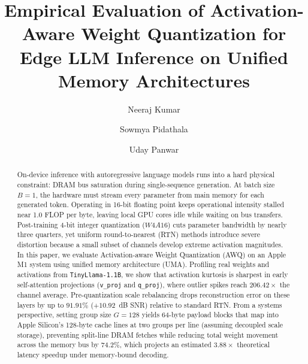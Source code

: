 \documentclass[runningheads,oribibl]{llncs}
\begin{document}
\title{Empirical Evaluation of Activation-Aware Weight Quantization for Edge LLM Inference on Unified Memory Architectures}

\author{Neeraj Kumar \and
Sowmya Pidathala \and
Uday Panwar}


\maketitle

\begin{abstract}
On-device inference with autoregressive language models runs into a hard physical constraint: DRAM bus saturation during single-sequence generation. At batch size $B=1$, the hardware must stream every parameter from main memory for each generated token. Operating in 16-bit floating point keeps operational intensity stalled near 1.0 FLOP per byte, leaving local GPU cores idle while waiting on bus transfers. Post-training 4-bit integer quantization ($W4A16$) cuts parameter bandwidth by nearly three quarters, yet uniform round-to-nearest (RTN) methods introduce severe distortion because a small subset of channels develop extreme activation magnitudes. In this paper, we evaluate Activation-aware Weight Quantization (AWQ) on an Apple M1 system using unified memory architecture (UMA). Profiling real weights and activations from \texttt{TinyLlama-1.1B}, we show that activation kurtosis is sharpest in early self-attention projections (\texttt{v\_proj} and \texttt{q\_proj}), where outlier spikes reach $206.42\times$ the channel average. Pre-quantization scale rebalancing drops reconstruction error on these layers by up to $91.91\%$ ($+10.92$~dB SNR) relative to standard RTN. From a systems perspective, setting group size $G=128$ yields 64-byte payload blocks that map into Apple Silicon's 128-byte cache lines at two groups per line (assuming decoupled scale storage), preventing split-line DRAM fetches while reducing total weight movement across the memory bus by $74.2\%$, which projects an estimated $3.88\times$ theoretical latency speedup under memory-bound decoding.

\end{abstract}
\end{document}
